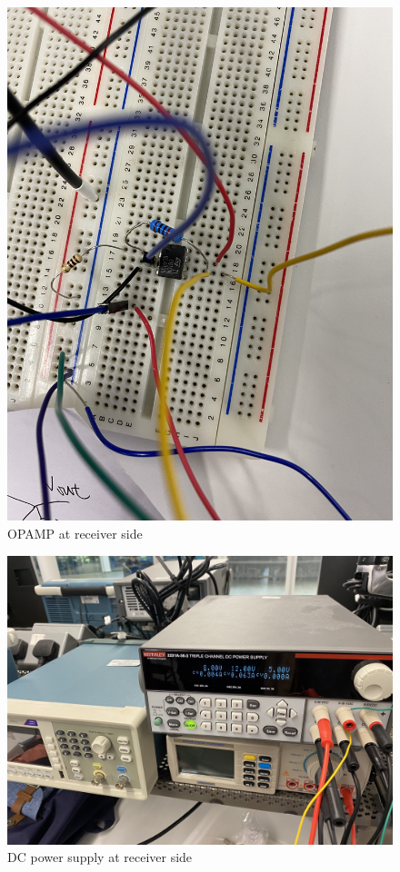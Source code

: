 \documentclass[12pt,a4paper]{report}
\begin{document}
\begin{figure}
    \centerline{\includegraphics[scale=0.1]{OPAMPAtReceiver.PNG}}
    \caption{OPAMP at receiver side}
    \label{fig:OPAMPR}
\end{figure}
\begin{figure}
    \centerline{\includegraphics[scale=0.1]{DC_PowerSupplyReceiver.PNG}}
    \caption{DC power supply at receiver side}
    \label{fig:DCR}
\end{figure}
\end{document}
